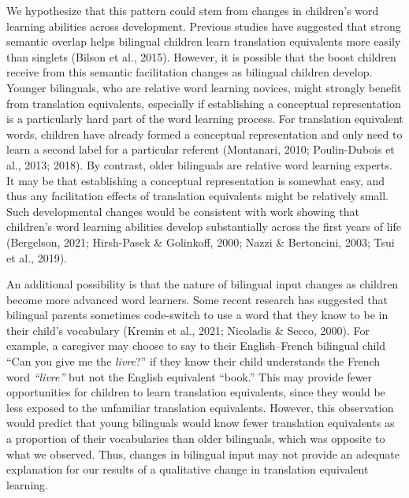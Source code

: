 \documentclass[
  english,
  ,man,floatsintext]{apa6}
\begin{document}
We hypothesize that this pattern could stem from changes in children's word learning abilities across development. Previous studies have suggested that strong semantic overlap helps bilingual children learn translation equivalents more easily than singlets (Bilson et al., 2015). However, it is possible that the boost children receive from this semantic facilitation changes as bilingual children develop. Younger bilinguals, who are relative word learning novices, might strongly benefit from translation equivalents, especially if establishing a conceptual representation is a particularly hard part of the word learning process. For translation equivalent words, children have already formed a conceptual representation and only need to learn a second label for a particular referent (Montanari, 2010; Poulin-Dubois et al., 2013; 2018). By contrast, older bilinguals are relative word learning experts. It may be that establishing a conceptual representation is somewhat easy, and thus any facilitation effects of translation equivalents might be relatively small. Such developmental changes would be consistent with work showing that children's word learning abilities develop substantially across the first years of life (Bergelson, 2021; Hirsh-Pasek \& Golinkoff, 2000; Nazzi \& Bertoncini, 2003; Tsui et al., 2019).

An additional possibility is that the nature of bilingual input changes as children become more advanced word learners. Some recent research has suggested that bilingual parents sometimes code-switch to use a word that they know to be in their child's vocabulary (Kremin et al., 2021; Nicoladis \& Secco, 2000). For example, a caregiver may choose to say to their English--French bilingual child ``Can you give me the \emph{livre}?'' if they know their child understands the French word \emph{``livre''} but not the English equivalent ``book.'' This may provide fewer opportunities for children to learn translation equivalents, since they would be less exposed to the unfamiliar translation equivalents. However, this observation would predict that young bilinguals would know fewer translation equivalents as a proportion of their vocabularies than older bilinguals, which was opposite to what we observed. Thus, changes in bilingual input may not provide an adequate explanation for our results of a qualitative change in translation equivalent learning.
\end{document}
